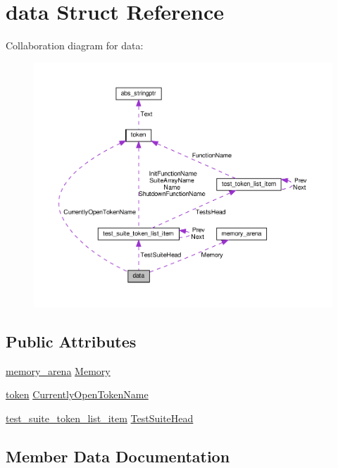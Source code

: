 \hypertarget{structdata}{}\section{data Struct Reference}
\label{structdata}


Collaboration diagram for data\+:\nopagebreak
\begin{figure}[H]
\begin{center}
\leavevmode
\includegraphics[width=350pt]{d7/dcf/structdata__coll__graph}
\end{center}
\end{figure}
\subsection*{Public Attributes}
\begin{DoxyCompactItemize}
\item 
\hyperlink{structmemory__arena}{memory\+\_\+arena} \hyperlink{structdata_ad3188e5c8551b604c9d2c3ddbf29a9b8}{Memory}
\item 
\hyperlink{structtoken}{token} \hyperlink{structdata_acd39ca2feac118a8faa8d82520494213}{Currently\+Open\+Token\+Name}
\item 
\hyperlink{structtest__suite__token__list__item}{test\+\_\+suite\+\_\+token\+\_\+list\+\_\+item} \hyperlink{structdata_a5bb01b3754cb4b3baf9b7f499022cd1e}{Test\+Suite\+Head}
\end{DoxyCompactItemize}


\subsection{Member Data Documentation}
\mbox{\label{structdata_acd39ca2feac118a8faa8d82520494213}} 
